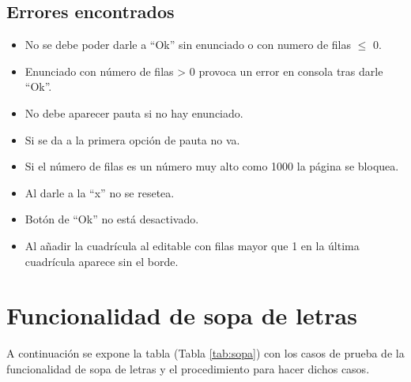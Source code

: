 \subsection{Errores encontrados}
\label{errores:desarrollo}
\begin{itemize}
    \item No se debe poder darle a ``Ok'' sin enunciado o con numero de filas $\leq$ 0.
    \item Enunciado con número de filas > 0 provoca un error en consola tras darle ``Ok''.
    \item No debe aparecer pauta si no hay enunciado.
    \item Si se da a la primera opción de pauta no va.
    \item Si el número de filas es un número muy alto como 1000 la página se bloquea.
    \item Al darle a la ``x'' no se resetea.
    \item Botón de ``Ok'' no está desactivado.
    \item  Al añadir la cuadrícula al editable con filas mayor que 1 en la última cuadrícula aparece sin el borde.

\end{itemize}

\section{Funcionalidad de sopa de letras}
\label{planPruebas:sopa}
A continuación se expone la tabla (Tabla \ref{tab:sopa}) con los casos de prueba de la funcionalidad de sopa de letras y el procedimiento para hacer dichos casos.

